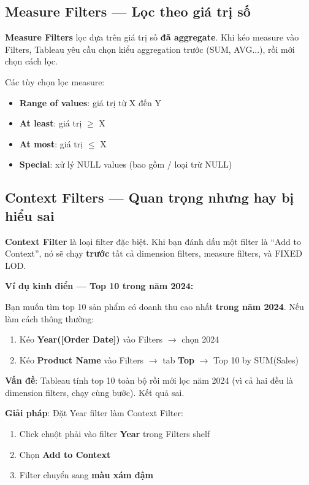 \documentclass[12pt]{article}
\begin{document}
\subsection{Measure Filters --- Lọc theo giá trị số}

\noindent \textbf{Measure Filters} lọc dựa trên giá trị số \textbf{đã aggregate}. Khi kéo measure vào Filters, Tableau yêu cầu chọn kiểu aggregation trước (SUM, AVG...), rồi mới chọn cách lọc.

\noindent Các tùy chọn lọc measure:
\begin{itemize}[nosep]
    \item \textbf{Range of values}: giá trị từ X đến Y
    \item \textbf{At least}: giá trị $\geq$ X
    \item \textbf{At most}: giá trị $\leq$ X
    \item \textbf{Special}: xử lý NULL values (bao gồm / loại trừ NULL)
\end{itemize}

\subsection{Context Filters --- Quan trọng nhưng hay bị hiểu sai}

\noindent \textbf{Context Filter} là loại filter đặc biệt. Khi bạn đánh dấu một filter là ``Add to Context'', nó sẽ chạy \textbf{trước} tất cả dimension filters, measure filters, và FIXED LOD.

\noindent \textbf{Ví dụ kinh điển --- Top 10 trong năm 2024:}

\noindent Bạn muốn tìm top 10 sản phẩm có doanh thu cao nhất \textbf{trong năm 2024}. Nếu làm cách thông thường:

\begin{enumerate}[nosep]
    \item Kéo \textbf{Year([Order Date])} vào Filters $\rightarrow$ chọn 2024
    \item Kéo \textbf{Product Name} vào Filters $\rightarrow$ tab \textbf{Top} $\rightarrow$ Top 10 by SUM(Sales)
\end{enumerate}

\noindent \textbf{Vấn đề}: Tableau tính top 10 toàn bộ rồi mới lọc năm 2024 (vì cả hai đều là dimension filters, chạy cùng bước). Kết quả sai.

\noindent \textbf{Giải pháp}: Đặt Year filter làm Context Filter:

\begin{enumerate}[nosep]
    \item Click chuột phải vào filter \textbf{Year} trong Filters shelf
    \item Chọn \textbf{Add to Context}
    \item Filter chuyển sang \textbf{màu xám đậm}
\end{enumerate}
\end{document}
